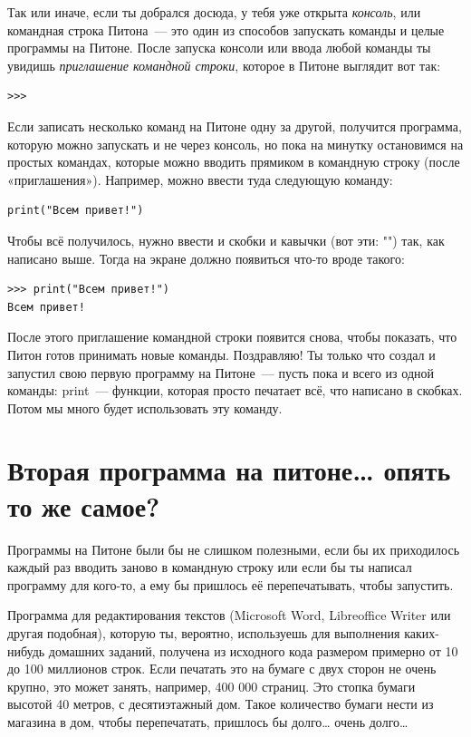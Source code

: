 Так или иначе, если ты добрался досюда, у тебя уже открыта \emph{консоль}, или командная строка Питона — это один из способов запускать команды и целые программы на Питоне. После запуска консоли или ввода любой команды ты увидишь \emph{приглашение командной строки}, которое в Питоне выглядит вот так:

\begin{verbatim}
>>>
\end{verbatim}

Если записать несколько команд на Питоне одну за другой, получится программа, которую можно запускать и не через консоль, но пока на минутку остановимся на простых командах, которые можно вводить прямиком в командную строку (после «приглашения»). Например, можно ввести туда следующую команду:

\begin{verbatim}
print("Всем привет!")
\end{verbatim}

Чтобы всё получилось, нужно ввести и скобки и кавычки (вот эти: "") так, как написано выше. Тогда на экране должно появиться что-то вроде такого:

\begin{verbatim}
>>> print("Всем привет!")
Всем привет!
\end{verbatim}

После этого приглашение командной строки появится снова, чтобы показать, что Питон готов принимать новые команды. Поздравляю! Ты только что создал и запустил свою первую программу на Питоне — пусть пока и всего из одной команды: print — функции, которая просто печатает всё, что написано в скобках. Потом мы много будет использовать эту команду.

\section{Вторая программа на питоне… опять то же самое?}

Программы на Питоне были бы не слишком полезными, если бы их приходилось каждый раз вводить заново в командную строку или если бы ты написал программу для кого-то, а ему бы пришлось её перепечатывать, чтобы запустить.

Программа для редактирования текстов (Microsoft Word, Libreoffice Writer или другая подобная), которую ты, вероятно, используешь для выполнения каких-нибудь домашних заданий, получена из исходного кода размером примерно от 10 до 100 миллионов строк. Если печатать это на бумаге с двух сторон не очень крупно, это может занять, например, 400 000 страниц. Это стопка бумаги высотой 40 метров, с десятиэтажный дом. Такое количество бумаги нести из магазина в дом, чтобы перепечатать, пришлось бы долго… очень долго…

